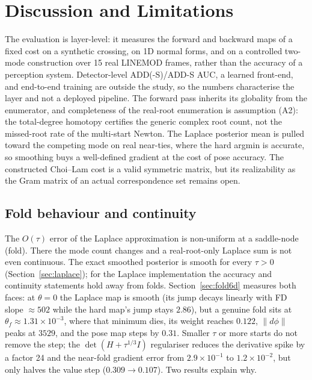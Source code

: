 \section{Discussion and Limitations}\label{sec:discussion}

The evaluation is layer-level: it measures the forward and backward maps of a fixed cost on a synthetic crossing, on 1D normal forms, and on a controlled two-mode construction over 15 real LINEMOD frames, rather than the accuracy of a perception system. Detector-level ADD(-S)/ADD-S AUC, a learned front-end, and end-to-end training are outside the study, so the numbers characterise the layer and not a deployed pipeline. The forward pass inherits its globality from the enumerator, and completeness of the real-root enumeration is assumption (A2): the total-degree homotopy certifies the generic complex root count, not the missed-root rate of the multi-start Newton. The Laplace posterior mean is pulled toward the competing mode on real near-ties, where the hard argmin is accurate, so smoothing buys a well-defined gradient at the cost of pose accuracy. The constructed Choi--Lam cost is a valid symmetric matrix, but its realizability as the Gram matrix of an actual correspondence set remains open.

\subsection{Fold behaviour and continuity}

The $O(\tau)$ error of the Laplace approximation is non-uniform at a saddle-node (fold). There the mode count changes and a real-root-only Laplace sum is not even continuous. The exact smoothed posterior is smooth for every $\tau>0$ (Section~\ref{sec:laplace}); for the Laplace implementation the accuracy and continuity statements hold away from folds. Section~\ref{sec:fold6d} measures both faces: at $\theta=0$ the Laplace map is smooth (its jump decays linearly with FD slope $\approx502$ while the hard map's jump stays $2.86$), but a genuine fold sits at $\theta_f\approx1.31\times10^{-3}$, where that minimum dies, its weight reaches $0.122$, $\|d\phi\|$ peaks at $3529$, and the pose map steps by $0.31$. Smaller $\tau$ or more starts do not remove the step; the $\det(H+\tau^{1/3}I)$ regulariser reduces the derivative spike by a factor 24 and the near-fold gradient error from $2.9\times10^{-1}$ to $1.2\times10^{-2}$, but only halves the value step ($0.309\to0.107$). Two results explain why.

